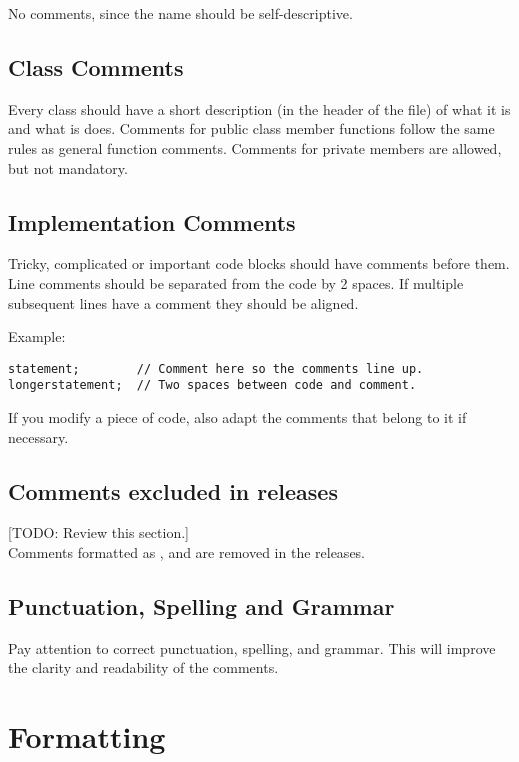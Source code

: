 No comments, since the name should be self-descriptive.

\subsection{Class Comments}

Every class should have a short description (in the header of the file) of what it is and what is does.
Comments for public class member functions follow the same rules as general function comments.
Comments for private members are allowed, but not mandatory.

\subsection{Implementation Comments}

Tricky, complicated or important code blocks should have comments before them.
Line comments should be separated from the code by 2 spaces.
If multiple subsequent lines have a comment they should be aligned.

Example:
\begin{lstlisting}
statement;        // Comment here so the comments line up.
longerstatement;  // Two spaces between code and comment.
\end{lstlisting}

If you modify a piece of code, also adapt the comments that belong to it if necessary.

\subsection{Comments excluded in releases}
[TODO: Review this section.]\\
Comments formatted as ,  and  are removed in the releases.

\subsection{Punctuation, Spelling and Grammar}

Pay attention to correct punctuation, spelling, and grammar. This will improve the clarity and readability of the comments.

\section{Formatting}

